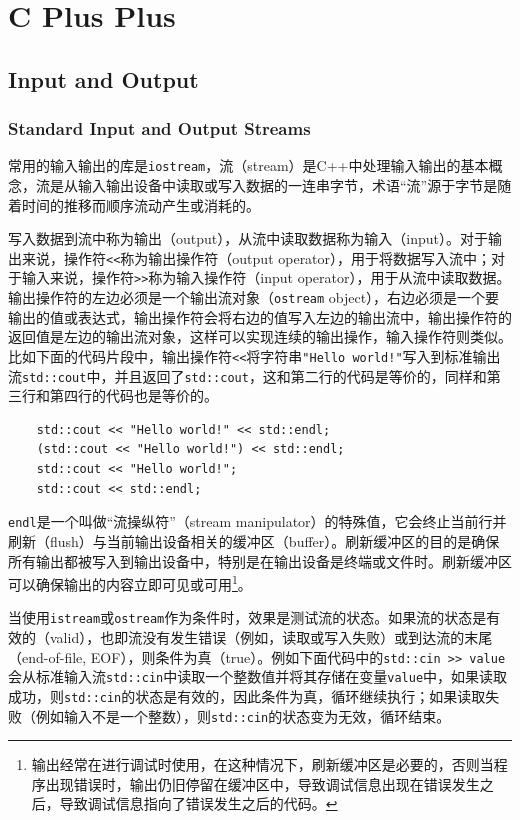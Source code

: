 \part{C Plus Plus}
\chapter{Input and Output}
\section{Standard Input and Output Streams}
常用的输入输出的库是\texttt{iostream}，流（stream）是C++中处理输入输出的基本概念，流是从输入输出设备中读取或写入数据的一连串字节，术语“流”源于字节是随着时间的推移而顺序流动产生或消耗的。

写入数据到流中称为输出（output），从流中读取数据称为输入（input）。对于输出来说，操作符\texttt{<<}称为输出操作符（output operator），用于将数据写入流中；对于输入来说，操作符\texttt{>>}称为输入操作符（input operator），用于从流中读取数据。输出操作符的左边必须是一个输出流对象（\texttt{ostream} object），右边必须是一个要输出的值或表达式，输出操作符会将右边的值写入左边的输出流中，输出操作符的返回值是左边的输出流对象，这样可以实现连续的输出操作，输入操作符则类似。比如下面的代码片段中，输出操作符\texttt{<<}将字符串\texttt{"Hello world!"}写入到标准输出流\texttt{std::cout}中，并且返回了\texttt{std::cout}，这和第二行的代码是等价的，同样和第三行和第四行的代码也是等价的。

\begin{verbatim}
    std::cout << "Hello world!" << std::endl;
    (std::cout << "Hello world!") << std::endl;
    std::cout << "Hello world!";
    std::cout << std::endl;
\end{verbatim}

\texttt{endl}是一个叫做“流操纵符”（stream manipulator）的特殊值，它会终止当前行并刷新（flush）与当前输出设备相关的缓冲区（buffer）。刷新缓冲区的目的是确保所有输出都被写入到输出设备中，特别是在输出设备是终端或文件时。刷新缓冲区可以确保输出的内容立即可见或可用\footnote{输出经常在进行调试时使用，在这种情况下，刷新缓冲区是必要的，否则当程序出现错误时，输出仍旧停留在缓冲区中，导致调试信息出现在错误发生之后，导致调试信息指向了错误发生之后的代码。}。

当使用\texttt{istream}或\texttt{ostream}作为条件时，效果是测试流的状态。如果流的状态是有效的（valid），也即流没有发生错误（例如，读取或写入失败）或到达流的末尾（end-of-file, EOF），则条件为真（true）。例如下面代码中的\texttt{std::cin >> value}会从标准输入流\texttt{std::cin}中读取一个整数值并将其存储在变量\texttt{value}中，如果读取成功，则\texttt{std::cin}的状态是有效的，因此条件为真，循环继续执行；如果读取失败（例如输入不是一个整数），则\texttt{std::cin}的状态变为无效，循环结束。

